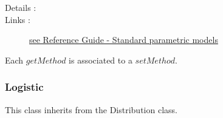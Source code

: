 \begin{description}
\item[Details :]  \rule{0pt}{1em}

\item[Links :]  \rule{0pt}{1em}
  \href{OpenTURNS_ReferenceGuide.pdf}{see Reference Guide - Standard parametric models}
\end{description}


Each  $getMethod$  is associated to a $setMethod$.

\newpage \subsubsection{Logistic}

This class inherits from the Distribution class.

